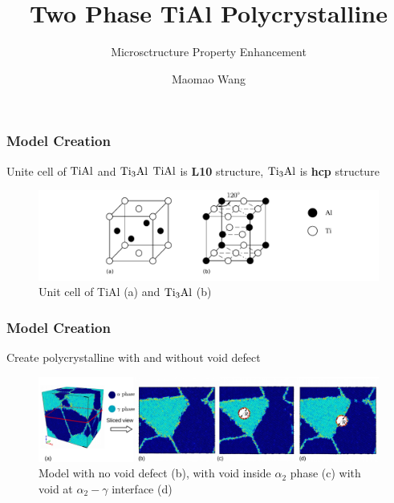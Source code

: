 \documentclass[12pt]{beamer}
\begin{document}
	\author{Maomao Wang}
	\title{Two Phase TiAl Polycrystalline}
	\subtitle{Microsctructure Property Enhancement}
	\begin{frame}[plain]
	\maketitle
\end{frame}

\begin{frame}
\frametitle{Model Creation}
Unite cell of $\rm{TiAl}$ and $\rm{Ti_3Al}$
$\rm{TiAl}$ is \textbf{L10} structure, $\rm{Ti_3Al}$ is \textbf{hcp} structure \textbf{}

\begin{figure}[ht]
	\centering
	\includegraphics[width=1\linewidth]{img/tial-cell}
	\caption{Unit cell of \rm{TiAl} (a) and $\rm{Ti_3Al}$ (b)}
	\label{fig:tial-cell}
\end{figure}
\end{frame}

\begin{frame}
\frametitle{Model Creation}
Create polycrystalline with and without void defect
\begin{figure}[ht]
	\centering
	\includegraphics[width=1\linewidth]{img/models}
	\caption{ Model with no void defect (b), with void inside $\alpha_2$ phase (c) with void at $\alpha_2-\gamma$ interface (d)}
	\label{fig:model-creation}
\end{figure}

\end{frame}
\end{document}
